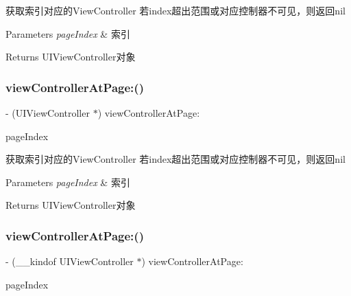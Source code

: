 获取索引对应的\+View\+Controller 若index超出范围或对应控制器不可见，则返回nil


\begin{DoxyParams}{Parameters}
{\em page\+Index} & 索引\\
\hline
\end{DoxyParams}
\begin{DoxyReturn}{Returns}
U\+I\+View\+Controller对象 
\end{DoxyReturn}
\mbox{\label{interface_v_t_magic_view_a0517e982834f1cebdb4f497b7c5d2706}} 
\subsubsection{\texorpdfstring{view\+Controller\+At\+Page\+:()}{viewControllerAtPage:()}\hspace{0.1cm}{\footnotesize\ttfamily [2/3]}}
{\footnotesize\ttfamily -\/ (U\+I\+View\+Controller $\ast$) view\+Controller\+At\+Page\+: \begin{DoxyParamCaption}\item[{(N\+S\+U\+Integer)}]{page\+Index }\end{DoxyParamCaption}}

获取索引对应的\+View\+Controller 若index超出范围或对应控制器不可见，则返回nil


\begin{DoxyParams}{Parameters}
{\em page\+Index} & 索引\\
\hline
\end{DoxyParams}
\begin{DoxyReturn}{Returns}
U\+I\+View\+Controller对象 
\end{DoxyReturn}
\mbox{\label{interface_v_t_magic_view_a16cb24e200dbf6952b217af4fd4e938e}} 
\subsubsection{\texorpdfstring{view\+Controller\+At\+Page\+:()}{viewControllerAtPage:()}\hspace{0.1cm}{\footnotesize\ttfamily [3/3]}}
{\footnotesize\ttfamily -\/ (\+\_\+\+\_\+kindof U\+I\+View\+Controller $\ast$) view\+Controller\+At\+Page\+: \begin{DoxyParamCaption}\item[{(N\+S\+U\+Integer)}]{page\+Index }\end{DoxyParamCaption}}

